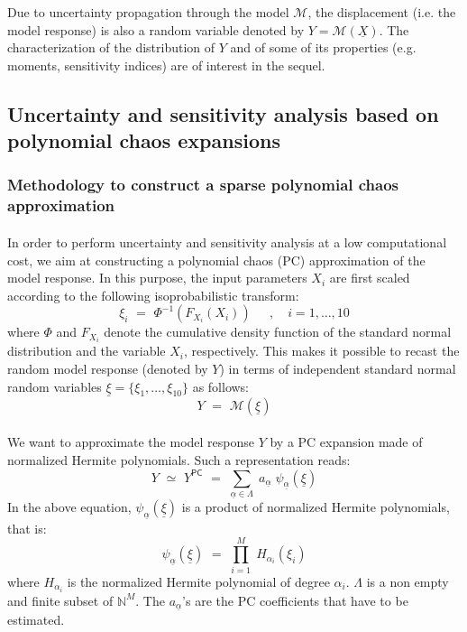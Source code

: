 \documentclass[11pt]{article}
\begin{document}
Due to uncertainty propagation through the model $\mathcal{M}$, the displacement (i.e. the model response) is also a random variable denoted by $Y = \mathcal{M}(\underline{X})$. The characterization of the distribution of $Y$ and of some of its properties (e.g. moments, sensitivity indices) are of interest in the sequel.

\subsection{Uncertainty and sensitivity analysis based on polynomial chaos expansions}

\subsubsection{Methodology to construct a sparse polynomial chaos approximation}

\paragraph{}
In order to perform uncertainty and sensitivity analysis at a low computational cost, we aim at constructing a polynomial chaos (PC) approximation of the model response. In this purpose, the input parameters $X_i$ are first scaled according to the following isoprobabilistic transform:
\begin{equation}
 \xi_i \, \, = \, \, \Phi^{-1}(F_{X_i}(X_i)) \, \quad \; , \quad i=1,\dots,10
\end{equation}
where $\Phi$ and $F_{X_i}$ denote the cumulative density function of the standard normal distribution and the variable $X_i$, respectively. This makes it possible to recast the random model response (denoted by $Y$) in terms of independent standard normal random variables $\underline{\xi} = \{\xi_1,\dots,\xi_{10}\}$ as follows:
\begin{equation}
 Y \, \, = \, \, \mathcal{M}(\underline{\xi})
\end{equation}

\paragraph{}
We want to approximate the model response $Y$ by a PC expansion made of normalized Hermite polynomials. Such a representation reads:
\begin{equation}
 Y \, \, \simeq \, \, Y^\textsf{PC} \, \, = \, \, \sum_{\underline{\alpha} \in \Lambda} \; a_{\underline{\alpha}} \; \psi_{\underline{\alpha}}(\underline{\xi})
\end{equation}
In the above equation, $\psi_{\underline{\alpha}}(\underline{\xi})$ is a product of normalized Hermite polynomials, that is:
\begin{equation}
 \psi_{\underline{\alpha}}(\underline{\xi}) \, \, = \, \, \prod_{i=1}^M \; H_{\alpha_i}(\xi_i)
\end{equation} 
where $H_{\alpha_i}$ is the normalized Hermite polynomial of degree $\alpha_i$. $\Lambda$ is a non empty and finite subset of $\mathbb{N}^M$. The $a_{\underline{\alpha}}$'s are the PC coefficients that have to be estimated.
\end{document}
